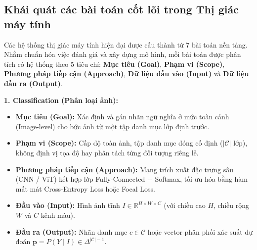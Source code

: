 \subsection{Khái quát các bài toán cốt lõi trong Thị giác máy tính}

Các hệ thống thị giác máy tính hiện đại được cấu thành từ 7 bài toán nền tảng. Nhằm chuẩn hóa việc đánh giá và xây dựng mô hình, mỗi bài toán được phân tích có hệ thống theo 5 tiêu chí: \textbf{Mục tiêu (Goal)}, \textbf{Phạm vi (Scope)}, \textbf{Phương pháp tiếp cận (Approach)}, \textbf{Dữ liệu đầu vào (Input)} và \textbf{Dữ liệu đầu ra (Output)}.

\textbf{1. Classification (Phân loại ảnh):}
\begin{itemize}
    \item \textbf{Mục tiêu (Goal):} Xác định và gán nhãn ngữ nghĩa ở mức toàn cảnh (Image-level) cho bức ảnh từ một tập danh mục lớp định trước.
    \item \textbf{Phạm vi (Scope):} Cấp độ toàn ảnh, tập danh mục đóng cố định ($|\mathcal{C}|$ lớp), không định vị tọa độ hay phân tách từng đối tượng riêng lẻ.
    \item \textbf{Phương pháp tiếp cận (Approach):} Mạng trích xuất đặc trưng sâu (CNN / ViT) kết hợp lớp Fully-Connected + Softmax, tối ưu hóa bằng hàm mất mát Cross-Entropy Loss hoặc Focal Loss.
    \item \textbf{Đầu vào (Input):} Hình ảnh tĩnh $I \in \mathbb{R}^{H \times W \times C}$ (với chiều cao $H$, chiều rộng $W$ và $C$ kênh màu).
    \item \textbf{Đầu ra (Output):} Nhãn danh mục $c \in \mathcal{C}$ hoặc vector phân phối xác suất dự đoán $\mathbf{p} = P(Y \mid I) \in \Delta^{|\mathcal{C}|-1}$.
\end{itemize}

